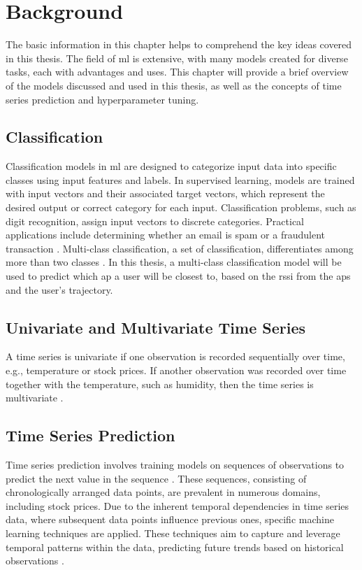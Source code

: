 \chapter{Background}\label{ch:background}

The basic information in this chapter helps to comprehend the key ideas covered in this thesis.
The field of \ac{ml} is extensive, with many models created for diverse tasks, each with advantages and uses.
This chapter will provide a brief overview of the models discussed and used in this thesis, as well as the concepts of time series prediction and hyperparameter tuning.

\section{Classification}

Classification models in \ac{ml} are designed to categorize input data into specific classes using input features and labels.
In supervised learning, models are trained with input vectors and their associated target vectors, which represent the desired output or correct category for each input.
Classification problems, such as digit recognition, assign input vectors to discrete categories.
Practical applications include determining whether an email is spam or a fraudulent transaction \cite{binary-classification}.
Multi-class classification, a set of classification, differentiates among more than two classes \cite{BishopPatternRecognition}.
In this thesis, a multi-class classification model will be used to predict which \ac{ap} a user will be closest to, based on the \ac{rssi} from the \acp{ap} and the user's trajectory.


\section{Univariate and Multivariate Time Series}

A time series is univariate if one observation is recorded sequentially over time, e.g., temperature or stock prices.
If another observation was recorded over time together with the temperature, such as humidity, then the time series is multivariate \cite{brownleeDeepLearningTime}.

\section{Time Series Prediction}

Time series prediction involves training models on sequences of observations to predict the next value in the sequence \cite{brownleeDeepLearningTime}.
These sequences, consisting of chronologically arranged data points, are prevalent in numerous domains, including stock prices.
Due to the inherent temporal dependencies in time series data, where subsequent data points influence previous ones, specific machine learning techniques are applied.
These techniques aim to capture and leverage temporal patterns within the data, predicting future trends based on historical observations \cite{neptune-ai}.

